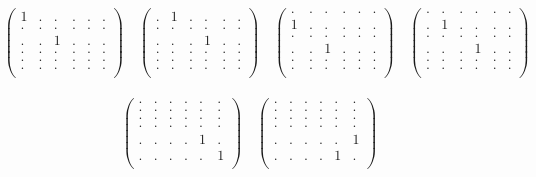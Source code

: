 \documentclass[12pt,a4paper]{amsart}
\begin{document}
\begin{align*}
  \left(
  \begin{array}{rrrr|rr}
    1&.&.&.&.&.\\
    .&.&.&.&.&.\\
    .&.&1&.&.&.\\
    .&.&.&.&.&.\\ \hline
    .&.&.&.&.&.\\
    .&.&.&.&.&.\\
  \end{array}
\right)
\quad
  \left(
  \begin{array}{rrrr|rr}
    .&1&.&.&.&.\\
    .&.&.&.&.&.\\
    .&.&.&1&.&.\\
    .&.&.&.&.&.\\ \hline
    .&.&.&.&.&.\\
    .&.&.&.&.&.\\
  \end{array}
\right)
\quad
  \left(
  \begin{array}{rrrr|rr}
    .&.&.&.&.&.\\
    1&.&.&.&.&.\\
    .&.&.&.&.&.\\
    .&.&1&.&.&.\\ \hline
    .&.&.&.&.&.\\
    .&.&.&.&.&.\\
  \end{array}
\right)
\quad
  \left(
  \begin{array}{rrrr|rr}
    .&.&.&.&.&.\\
    .&1&.&.&.&.\\
    .&.&.&.&.&.\\
    .&.&.&1&.&.\\ \hline
    .&.&.&.&.&.\\
    .&.&.&.&.&.\\
  \end{array}
\right)
\end{align*}

\begin{align*}
  \left(
  \begin{array}{rrrr|rr}
    .&.&.&.&.&.\\
    .&.&.&.&.&.\\
    .&.&.&.&.&.\\
    .&.&.&.&.&.\\ \hline
    .&.&.&.&1&.\\
    .&.&.&.&.&1\\
  \end{array}
\right)
\quad
  \left(
  \begin{array}{rrrr|rr}
    .&.&.&.&.&.\\
    .&.&.&.&.&.\\
    .&.&.&.&.&.\\
    .&.&.&.&.&.\\ \hline
    .&.&.&.&.&1\\
    .&.&.&.&1&.\\
  \end{array}
\right)
\end{align*}
\end{document}
